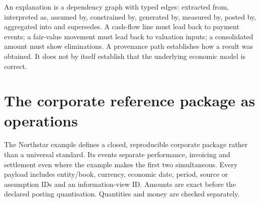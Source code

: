 An explanation is a dependency graph with typed edges: extracted from,
interpreted as, assumed by, constrained by, generated by, measured by,
posted by, aggregated into and supersedes. A cash-flow line must lead back
to payment events; a fair-value movement must lead back to valuation inputs;
a consolidated amount must show eliminations. A provenance path establishes
how a result was obtained. It does not by itself establish that the underlying
economic model is correct.

\section{The corporate reference package as operations}

The Northstar example defines a closed, reproducible corporate package rather
than a universal standard. Its events separate performance, invoicing and
settlement even where the example makes the first two simultaneous. Every
payload includes entity/book, currency, economic date, period, source or
assumption IDs and an information-view ID. Amounts are exact before the
declared posting quantisation. Quantities and money are checked separately.

